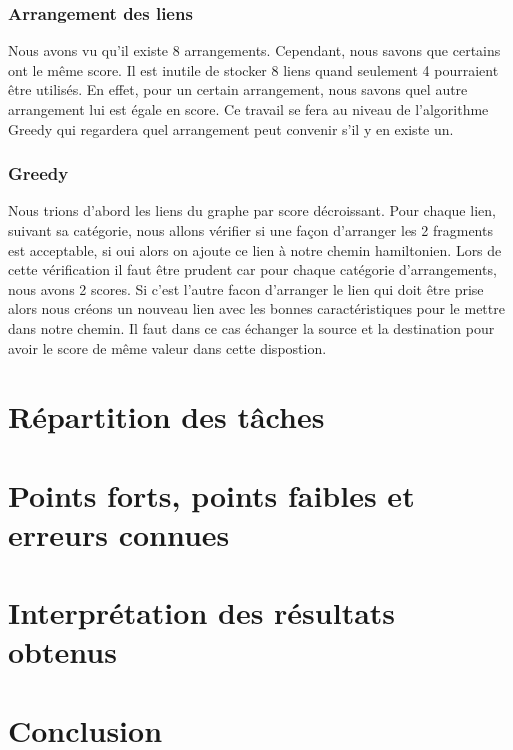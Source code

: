 \documentclass{article}
\begin{document}
\subsubsection{Arrangement des liens}
Nous avons vu qu'il existe 8 arrangements. Cependant, nous savons que certains ont le même score. Il est inutile de stocker 8 liens quand seulement 4 pourraient être utilisés. En effet, pour un certain arrangement, nous savons quel autre arrangement lui est égale en score. Ce travail se fera au niveau de l'algorithme Greedy qui regardera quel arrangement peut convenir s'il y en existe un. 
\subsubsection{Greedy}
Nous trions d'abord les liens du graphe par score décroissant. Pour chaque lien, suivant sa catégorie, nous allons vérifier si une façon d'arranger les 2 fragments est acceptable, si oui alors on ajoute ce lien à notre chemin hamiltonien.
Lors de cette vérification il faut être prudent car pour chaque catégorie d'arrangements, nous avons 2 scores. Si c'est l'autre facon d'arranger le lien qui doit être prise alors nous créons un nouveau lien avec les bonnes caractéristiques pour le mettre dans notre chemin. Il faut dans ce cas échanger la source et la destination pour avoir le score de même valeur dans cette dispostion.
 

\section{Répartition des tâches}
\section{Points forts, points faibles et erreurs connues}
\section{Interprétation des résultats obtenus}
\section{Conclusion}
\end{document}
